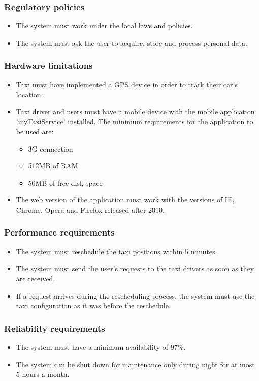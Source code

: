 \subsubsection{Regulatory policies}
	\begin{itemize}
		\item The system must work under the local laws and policies.
		\item The system must ask the user to acquire, store and process personal data. 
	\end{itemize}
	
\subsubsection{Hardware limitations}
	\begin{itemize}
		\item Taxi must have implemented a GPS device in order to track their car's location.
		\item Taxi driver and users must have a mobile device with the mobile application 'myTaxiService' installed. The minimum requirements for the application to be used are: 
		\begin{itemize}
			\item 3G connection
			\item 512MB of RAM
			\item 50MB of free disk space
		\end{itemize}
		\item The web version of the application must work with the versions of IE, Chrome, Opera and Firefox released after 2010.
	\end{itemize}

\subsubsection{Performance requirements}
	\begin{itemize}
		\item The system must reschedule the taxi positions within 5 minutes.
		\item The system must send the user's requests to the taxi drivers as soon as they are received.
		\item If a request arrives during the rescheduling process, the system must use the taxi configuration as it was before the reschedule.
	\end{itemize}

\subsubsection{Reliability requirements}
	\begin{itemize}
		\item The system must have a minimum availability of 97\%.
		\item The system can be shut down for maintenance only during night for at most 5 hours a month.
	\end{itemize}

